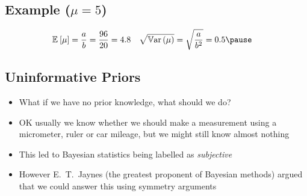 
\begin{slide}
\section[-2]{Example ($\mu=5$)}
\pb
\pause{}
\begin{center}
  \pause
\end{center}
\vspace*{-1cm}
\begin{align*}
  \av{\mu} &= \frac{a}{b} = \frac{96}{20} = 4.8 &
  \sqrt{\Var{\mu}} &=  \sqrt{\frac{a}{b^2}} = 0.5\pause
\end{align*}
\end{slide}

\Outline

\begin{slide}
\section{Uninformative Priors}

\begin{PauseHighLight}
  \begin{itemize}
  \item What if we have no prior knowledge, what should we do?\pause
  \item OK usually we know whether we should make a measurement using a
    micrometer, ruler or car mileage, but we might still know almost
    nothing\pause
  \item This led to Bayesian statistics being labelled as
    \textit{subjective}\pause
  \item However E.~T.~Jaynes (the greatest proponent of Bayesian methods)
    argued that we could answer this using symmetry arguments\pause
  \end{itemize}
\end{PauseHighLight}

\end{slide}



